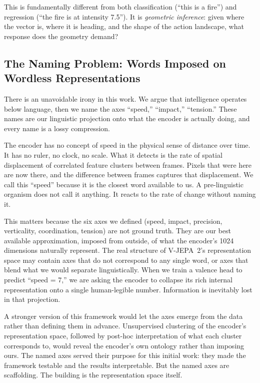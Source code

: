 \documentclass[11pt]{article}
\begin{document}
This is fundamentally different from both classification (``this is a fire'') and regression (``the fire is at intensity 7.5''). It is \emph{geometric inference}: given where the vector is, where it is heading, and the shape of the action landscape, what response does the geometry demand?

\subsection{The Naming Problem: Words Imposed on Wordless Representations}

There is an unavoidable irony in this work. We argue that intelligence operates below language, then we name the axes ``speed,'' ``impact,'' ``tension.'' These names are our linguistic projection onto what the encoder is actually doing, and every name is a lossy compression.

The encoder has no concept of speed in the physical sense of distance over time. It has no ruler, no clock, no scale. What it detects is the rate of spatial displacement of correlated feature clusters between frames. Pixels that were here are now there, and the difference between frames captures that displacement. We call this ``speed'' because it is the closest word available to us. A pre-linguistic organism does not call it anything. It reacts to the rate of change without naming it.

This matters because the six axes we defined (speed, impact, precision, verticality, coordination, tension) are not ground truth. They are our best available approximation, imposed from outside, of what the encoder's 1024 dimensions naturally represent. The real structure of V-JEPA~2's representation space may contain axes that do not correspond to any single word, or axes that blend what we would separate linguistically. When we train a valence head to predict ``speed = 7,'' we are asking the encoder to collapse its rich internal representation onto a single human-legible number. Information is inevitably lost in that projection.

A stronger version of this framework would let the axes emerge from the data rather than defining them in advance. Unsupervised clustering of the encoder's representation space, followed by post-hoc interpretation of what each cluster corresponds to, would reveal the encoder's own ontology rather than imposing ours. The named axes served their purpose for this initial work: they made the framework testable and the results interpretable. But the named axes are scaffolding. The building is the representation space itself.
\end{document}
